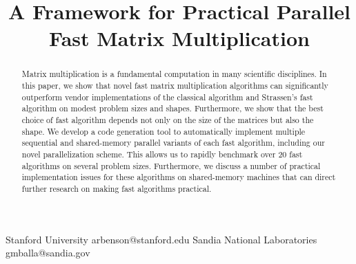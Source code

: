 \documentclass[preprint]{sigplanconf}
\newcommand{\Dsquare}[1]{\left\llbracket #1 \right\rrbracket}
\begin{document}
\newcommand{\TODO}[1]{\textcolor{blue}{\textbf{TODO XXXXX: #1}}}
\newcommand{\GB}[1]{\textcolor{red}{\textbf{GB: #1}}}
\newcommand{\vecmat}[1]{\text{vec}\left(#1\right)}
\newcommand{\nnz}[1]{\text{nnz}\left(#1\right)}
\newcommand{\diag}[1]{\text{diag}\left(#1\right)}
\newcommand{\bc}[3]{\left\langle#1, #2, #3\right\rangle}
\newcommand{\alg}[3]{\Dsquare{#1, #2, #3}}
\newcommand{\dims}[3]{#1 \times #2 \times #3}
\newcommand{\daxpy}{\texttt{daxpy}}
\newcommand{\dgemm}{\texttt{dgemm}}
\newcommand{\lt}{\left}
\newcommand{\rt}{\right}

\setlength{\pdfpageheight}{\paperheight}
\setlength{\pdfpagewidth}{\paperwidth}








\titlebanner{}\preprintfooter{}

\title{A Framework for Practical Parallel Fast Matrix Multiplication}




           {Stanford University}
           {arbenson@stanford.edu}
           {Sandia National Laboratories}
           {gmballa@sandia.gov}


\maketitle

\begin{abstract}
Matrix multiplication is a fundamental computation in many scientific disciplines.
In this paper, we show that novel fast matrix multiplication algorithms can significantly outperform vendor implementations of the classical algorithm and Strassen's fast algorithm on modest problem sizes and shapes.
Furthermore, we show that the best choice of fast algorithm depends not only on the size of the matrices but also the shape.
We develop a code generation tool to automatically implement multiple sequential and shared-memory parallel variants of each fast algorithm, including our novel parallelization scheme.
This allows us to rapidly benchmark over 20 fast algorithms on several problem sizes.
Furthermore, we discuss a number of practical implementation issues for these algorithms on shared-memory machines that can direct further research on making fast algorithms practical.
\end{abstract}
\end{document}
